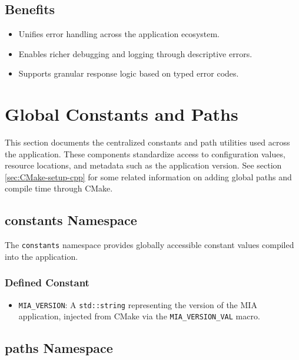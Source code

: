 \subsection*{Benefits}
\begin{itemize}
	\item Unifies error handling across the application ecosystem.
	\item Enables richer debugging and logging through descriptive errors.
	\item Supports granular response logic based on typed error codes.
\end{itemize}








\section{Global Constants and Paths}
\label{sec:global-constants-and-paths}

This section documents the centralized constants and path utilities used across the application. These components standardize access to configuration values, resource locations, and metadata such as the application version. See section \ref{sec:CMake-setup-cpp} for some related information on adding global paths and compile time through CMake.

\subsection{constants Namespace}

The \texttt{constants} namespace provides globally accessible constant values compiled into the application.

\subsubsection*{Defined Constant}
\begin{itemize}
	\item \texttt{MIA\_VERSION}: A \texttt{std::string} representing the version of the MIA application, injected from CMake via the \texttt{MIA\_VERSION\_VAL} macro.
\end{itemize}

\subsection{paths Namespace}

